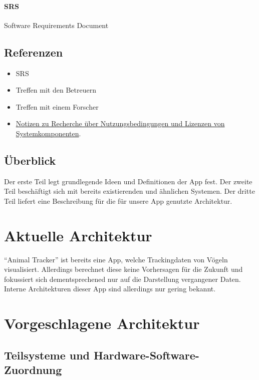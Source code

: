 \documentclass[12pt]{article} %
\begin{document}
	\paragraph{SRS} Software Requirements Document



\subsection{Referenzen}
\begin{itemize}
	\item SRS
	\item Treffen mit den Betreuern
	\item Treffen mit einem Forscher
	\item \href{https://git.uni-konstanz.de/kn/swp2018/group12/tree/master/Dokumentation/Lizenzen}{Notizen zu Recherche über Nutzungsbedingungen und Lizenzen von Systemkomponenten}.
\end{itemize}


\subsection{Überblick}

Der erste Teil legt grundlegende Ideen und Definitionen der App fest. Der zweite Teil beschäftigt sich mit bereits existierenden und ähnlichen Systemen. Der dritte Teil liefert eine Beschreibung für die für unsere App genutzte Architektur.  





\section{Aktuelle Architektur}

\enquote{Animal Tracker} ist bereits eine App, welche Trackingdaten von Vögeln visualisiert. Allerdings berechnet diese keine Vorhersagen für die Zukunft und fokussiert sich dementsprechened nur auf die Darstellung vergangener Daten. Interne Architekturen dieser App sind allerdings nur gering bekannt.


\section{Vorgeschlagene Architektur}



\subsection{Teilsysteme und Hardware-Software-Zuordnung}
\end{document}
